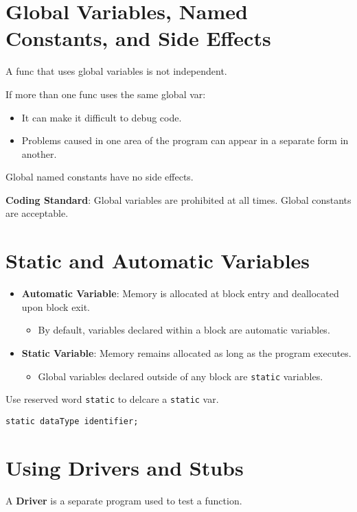 \documentclass{article}
\begin{document}
\section{Global Variables, Named Constants, and Side Effects}
A func that uses global variables is not independent.

\vspace{8pt}
If more than one func uses the same global var:
\begin{itemize}
  \item It can make it difficult to debug code.
  \item Problems caused in one area of the program can appear in a separate form
    in another.
\end{itemize}

Global named constants have no side effects.

\vspace{8pt}
\textbf{Coding Standard}: Global variables are prohibited at all times.
Global constants are acceptable.

\section{Static and Automatic Variables}
\begin{itemize}
  \item \textbf{Automatic Variable}: Memory is allocated at block entry and
    deallocated upon block exit.
  \begin{itemize}
    \item By default, variables declared within a block are automatic variables. 
  \end{itemize}
  \item \textbf{Static Variable}: Memory remains allocated as long as the
    program executes.
  \begin{itemize}
    \item Global variables declared outside of any block are \texttt{static}
      variables.
  \end{itemize}
\end{itemize}

Use reserved word \texttt{static} to delcare a \texttt{static} var.

\begin{lstlisting}[caption={\texttt{static} Variable Declaration}]
  static dataType identifier;
\end{lstlisting}

\section{Using Drivers and Stubs}
A \textbf{Driver} is a separate program used to test a function.
\end{document}
